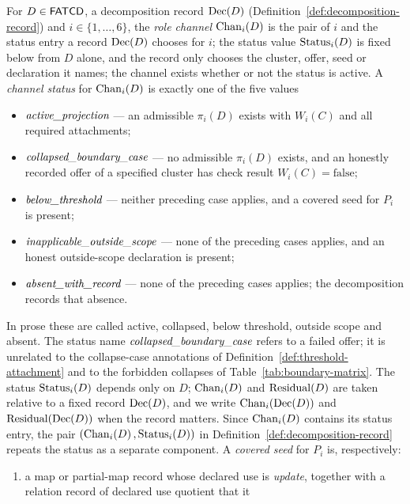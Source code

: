 \begin{definition}\label{def:channel-status}
For \(D\in\mathsf{FATCD}{}\), a decomposition record \(\operatorname{Dec}\!\left(D\right)\)
(Definition~\ref{def:decomposition-record}) and \(i \in \{1,\ldots,6\}\), the
\emph{role channel} \(\operatorname{Chan}_{i}\!\left(D\right)\) is the pair of \(i\) and the status entry a
record \(\operatorname{Dec}\!\left(D\right)\) chooses for \(i\); the status value \(\operatorname{Status}_{i}\!\left(D\right)\) is fixed
below from \(D\) alone, and the record only chooses the cluster, offer, seed or
declaration it names; the channel exists whether or not the status is
active. A \emph{channel status} for
\(\operatorname{Chan}_{i}\!\left(D\right)\) is exactly one of the five values
\begin{itemize}[topsep=2pt,itemsep=1pt]
  \item \(\textit{active\_\allowbreak projection}\) --- an admissible \(\pi_i(D)\) exists with \(W_i(C)\)
    and all required attachments;
  \item \(\textit{collapsed\_\allowbreak boundary\_\allowbreak case}\) --- no admissible \(\pi_i(D)\) exists, and an
    honestly recorded offer of a specified cluster has check result
    \(W_i(C)=\mathrm{false}\);
  \item \(\textit{below\_\allowbreak threshold}\) --- neither preceding case applies, and a covered seed for
    \(P_i\) is present;
  \item \(\textit{inapplicable\_\allowbreak outside\_\allowbreak scope}\) --- none of the preceding cases applies, and an
    honest outside-scope declaration is present;
  \item \(\textit{absent\_\allowbreak with\_\allowbreak record}\) --- none of the preceding cases applies; the
    decomposition records that absence.
\end{itemize}
In prose these are called active, collapsed, below threshold, outside scope and absent. The status name \(\textit{collapsed\_\allowbreak boundary\_\allowbreak case}\) refers to a failed offer; it is unrelated to
the collapse-case annotations of Definition~\ref{def:threshold-attachment} and
to the forbidden collapses of Table~\ref{tab:boundary-matrix}.
The status \(\operatorname{Status}_{i}\!\left(D\right)\) depends only on \(D\); \(\operatorname{Chan}_{i}\!\left(D\right)\) and
\(\operatorname{Residual}\!\left(D\right)\) are taken relative to a fixed record \(\operatorname{Dec}\!\left(D\right)\), and we write
\(\operatorname{Chan}_{i}\!\left(\operatorname{Dec}\!\left(D\right)\right)\) and \(\operatorname{Residual}\!\left(\operatorname{Dec}\!\left(D\right)\right)\) when the record matters. Since
\(\operatorname{Chan}_{i}\!\left(D\right)\) contains its status entry, the pair
\((\operatorname{Chan}_{i}\!\left(D\right),\operatorname{Status}_{i}\!\left(D\right))\) in Definition~\ref{def:decomposition-record}
repeats the status as a separate component. A \emph{covered seed} for \(P_i\) is, respectively:
\begin{enumerate}[label=(\arabic*),topsep=2pt,itemsep=1pt]
  \item a map or partial-map record whose
declared use is \emph{update}, together with a relation record of declared use quotient that it

\end{enumerate}
\end{definition}
